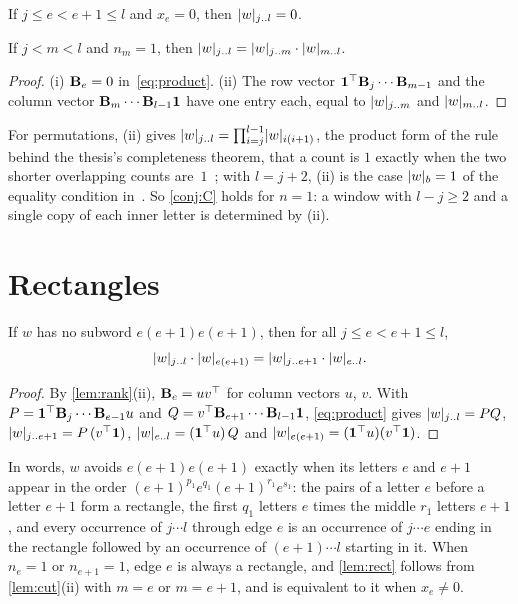 \documentclass[11pt,a4paper]{article}
\begin{document}
\begin{lemma}\label{lem:cut}
\begin{parts}
\item If $j\le e<e+1\le l$ and $x_e=0$, then $\lvert w\rvert_{j\mathinner{\ldotp\ldotp} l}=0$.
\item If $j<m<l$ and $n_m=1$, then $\lvert w\rvert_{j\mathinner{\ldotp\ldotp} l}=\lvert w\rvert_{j\mathinner{\ldotp\ldotp} m}\cdot\lvert w\rvert_{m\mathinner{\ldotp\ldotp} l}$.
\end{parts}
\end{lemma}

\begin{proof}
(i) $\mathbf{B}_{e}=0$ in~\eqref{eq:product}. (ii) The row vector $\mathbf{1}^{\top}\mathbf{B}_{j}\cdots\mathbf{B}_{m-1}$ and the column vector $\mathbf{B}_{m}\cdots\mathbf{B}_{l-1}\mathbf{1}$ have one entry each, equal to $\lvert w\rvert_{j\mathinner{\ldotp\ldotp} m}$ and $\lvert w\rvert_{m\mathinner{\ldotp\ldotp} l}$.
\end{proof}

For permutations, (ii) gives $\lvert w\rvert_{j\mathinner{\ldotp\ldotp} l}=\prod_{i=j}^{l-1}\lvert w\rvert_{i(i+1)}$, the product form of the rule behind the thesis's completeness theorem, that a count is $1$ exactly when the two shorter overlapping counts are~$1$~\cite[Proposition~3.4, Theorem~3.5, ]{Yamba06}; with $l=j+2$, (ii) is the case $\lvert w\rvert_{b}=1$ of the equality condition in~\cite[Lemma~2, p.~12]{MSY04}. So \cref{conj:C} holds for $n=1$: a window with $l-j\ge2$ and a single copy of each inner letter is determined by (ii).

\section{Rectangles}\label{sec:rect}

\begin{lemma}\label{lem:rect}
If $w$ has no subword $e(e+1)e(e+1)$, then for all $j\le e<e+1\le l$,
\[
\lvert w\rvert_{j\mathinner{\ldotp\ldotp} l}\cdot\lvert w\rvert_{e(e+1)}=\lvert w\rvert_{j\mathinner{\ldotp\ldotp} e+1}\cdot\lvert w\rvert_{e\mathinner{\ldotp\ldotp} l}.
\]
\end{lemma}

\begin{proof}
By \cref{lem:rank}(ii), $\mathbf{B}_{e}=uv^{\top}$ for column vectors $u$, $v$. With $P=\mathbf{1}^{\top}\mathbf{B}_{j}\cdots\mathbf{B}_{e-1}u$ and $Q=v^{\top}\mathbf{B}_{e+1}\cdots\mathbf{B}_{l-1}\mathbf{1}$, \eqref{eq:product} gives $\lvert w\rvert_{j\mathinner{\ldotp\ldotp} l}=PQ$, $\lvert w\rvert_{j\mathinner{\ldotp\ldotp} e+1}=P\,(v^{\top}\mathbf{1})$, $\lvert w\rvert_{e\mathinner{\ldotp\ldotp} l}=(\mathbf{1}^{\top}u)\,Q$ and $\lvert w\rvert_{e(e+1)}=(\mathbf{1}^{\top}u)(v^{\top}\mathbf{1})$.
\end{proof}

In words, $w$ avoids $e(e+1)e(e+1)$ exactly when its letters $e$ and $e+1$ appear in the order $(e+1)^{p_1}e^{q_1}(e+1)^{r_1}e^{s_1}$: the pairs of a letter $e$ before a letter $e+1$ form a rectangle, the first $q_1$ letters $e$ times the middle $r_1$ letters $e+1$, and every occurrence of $j\cdots l$ through edge $e$ is an occurrence of $j\cdots e$ ending in the rectangle followed by an occurrence of $(e+1)\cdots l$ starting in it. When $n_e=1$ or $n_{e+1}=1$, edge $e$ is always a rectangle, and \cref{lem:rect} follows from \cref{lem:cut}(ii) with $m=e$ or $m=e+1$, and is equivalent to it when $x_e\ne0$.
\end{document}
